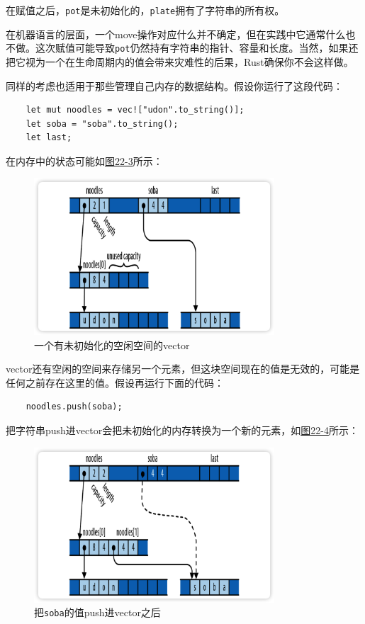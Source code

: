 在赋值之后，\texttt{pot}是未初始化的，\texttt{plate}拥有了字符串的所有权。

在机器语言的层面，一个move操作对应什么并不确定，但在实践中它通常什么也不做。这次赋值可能导致\texttt{pot}仍然持有字符串的指针、容量和长度。当然，如果还把它视为一个在生命周期内的值会带来灾难性的后果，Rust确保你不会这样做。

同样的考虑也适用于那些管理自己内存的数据结构。假设你运行了这段代码：
\begin{verbatim}
    let mut noodles = vec!["udon".to_string()];
    let soba = "soba".to_string();
    let last;
\end{verbatim}

在内存中的状态可能如\hyperref[f22-3]{图22-3}所示：

\begin{figure}[htbp]
    \centering
    \includegraphics[width=0.8\textwidth]{../img/f22-3.png}
    \caption{一个有未初始化的空闲空间的vector}
    \label{f22-3}
\end{figure}

vector还有空闲的空间来存储另一个元素，但这块空间现在的值是无效的，可能是任何之前存在这里的值。假设再运行下面的代码：
\begin{verbatim}
    noodles.push(soba);
\end{verbatim}

把字符串push进vector会把未初始化的内存转换为一个新的元素，如\hyperref[f22-4]{图22-4}所示：
\begin{figure}[htbp]
    \centering
    \includegraphics[width=0.8\textwidth]{../img/f22-4.png}
    \caption{把\texttt{soba}的值push进vector之后}
    \label{f22-4}
\end{figure}


